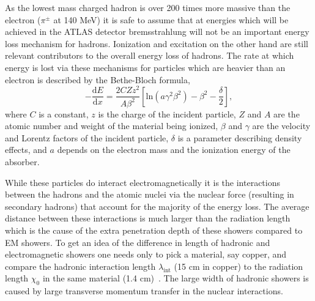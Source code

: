 As the lowest mass charged hadron is over 200 times more massive than the electron ($\pi^{\pm}$ at 140 MeV) it is safe to assume that at energies which will be achieved in the ATLAS detector bremsstrahlung will not be an important energy loss mechanism for hadrons.  
Ionization and excitation on the other hand are still relevant contributors to the overall energy loss of hadrons.  
The rate at which energy is lost via these mechanisms for particles which are heavier than an electron is described by the Bethe-Bloch formula,  
\begin{equation}
-\frac{\mathrm{d}E}{\mathrm{d}x}=\frac{2CZz^2}{A\beta^2}\left[\mathrm{ln}\left(a\gamma^2\beta^2\right)-\beta^2-\frac{\delta}{2}\right], 
\end{equation}
where $C$ is a constant, $z$ is the charge of the incident particle, $Z$ and $A$ are the atomic number and weight of the material being ionized, $\beta$ and $\gamma$ are the velocity and Lorentz factors of the incident particle, $\delta$ is a parameter describing density effects, and $a$ depends on the electron mass and the ionization energy of the absorber.  

While these particles do interact electromagnetically it is the interactions between the hadrons and the atomic nuclei via the nuclear force (resulting in secondary hadrons) that account for the majority of the energy loss.  
The average distance between these interactions is much larger than the radiation length which is the cause of the extra penetration depth of these showers compared to EM showers.  
To get an idea of the difference in length of hadronic and electromagnetic showers one needs only to pick a material, say copper, and compare the hadronic interaction length $\lambda_{\mathrm{int}}$ (15 cm in copper) to the radiation length $\chi_{0}$ in the same material (1.4 cm)~\cite{Wigmans2008}.  
The large width of hadronic showers is caused by large transverse momentum transfer in the nuclear interactions.  

